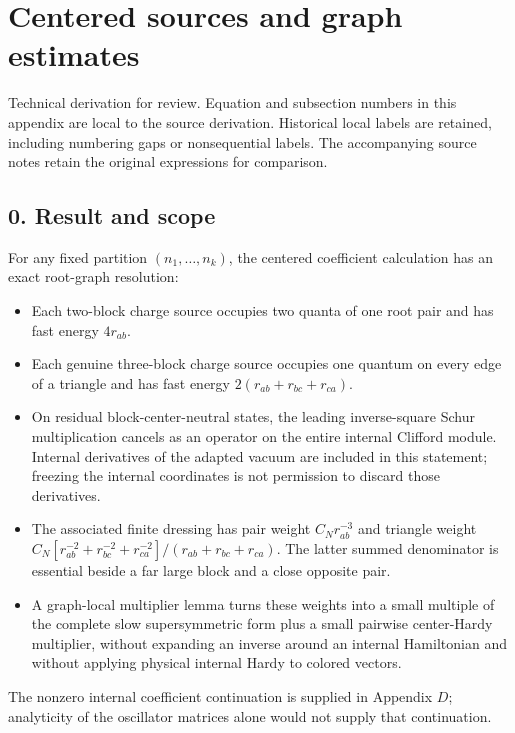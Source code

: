 \clearpage
\section{Centered sources and graph
estimates}\label{c-centered-sources-and-graph-estimates}

Technical derivation for review. Equation and subsection numbers in this
appendix are local to the source derivation. Historical local labels are
retained, including numbering gaps or nonsequential labels. The
accompanying source notes retain the original expressions for
comparison.

\subsection{0. Result and scope}\label{c-result-and-scope}

For any fixed partition \((n_{1},\ldots ,n_{k})\), the centered
coefficient calculation has an exact root-graph resolution:

\begin{itemize}
\tightlist
\item
  Each two-block charge source occupies two quanta of one root pair and
  has fast energy \(4r_{ab}\).
\item
  Each genuine three-block charge source occupies one quantum on every
  edge of a triangle and has fast energy \(2(r_{ab}+r_{bc}+r_{ca})\).
\item
  On residual block-center-neutral states, the leading inverse-square
  Schur multiplication cancels as an operator on the entire internal
  Clifford module. Internal derivatives of the adapted vacuum are
  included in this statement; freezing the internal coordinates is not
  permission to discard those derivatives.
\item
  The associated finite dressing has pair weight \(C_{N} r_{ab}^{-3}\)
  and triangle weight
  \(C_{N} [r_{ab}^{-2}+r_{bc}^{-2}+r_{ca}^{-2}]/(r_{ab}+r_{bc}+r_{ca})\).
  The latter summed denominator is essential beside a far large block
  and a close opposite pair.
\item
  A graph-local multiplier lemma turns these weights into a small
  multiple of the complete slow supersymmetric form plus a small
  pairwise center-Hardy multiplier, without expanding an inverse around
  an internal Hamiltonian and without applying physical internal Hardy
  to colored vectors.
\end{itemize}

The nonzero internal coefficient continuation is supplied in Appendix
\(D\); analyticity of the oscillator matrices alone would not supply
that continuation.

